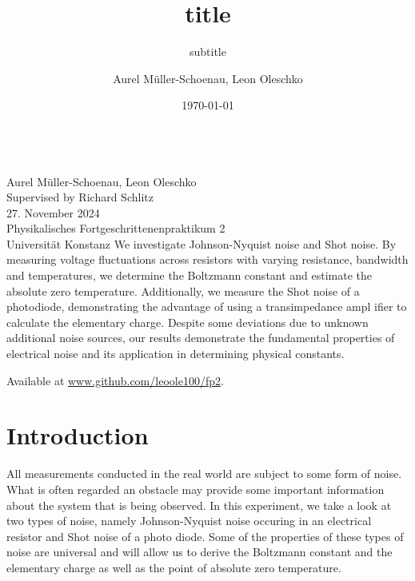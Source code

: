 \documentclass[
    parskip=half, 
    twoside=false,
    twocolumn=true,
    fontsize=11pt,
]{scrarticle}
\begin{document}
\title{title}
\subtitle{subtitle}
\author{Aurel Müller-Schoenau, Leon Oleschko}
\date{\dotdate\today}


\begin{titlepage}
    \sffamily
    \vspace*{3cm}
    {
        \fontsize{32}{32}
    }
    \vspace{.25cm}\\
    {
        \Large
        Aurel Müller-Schoenau, Leon Oleschko\\
        Supervised by Richard Schlitz
        \vspace{.05cm}\\
        27. November 2024
        \vspace{.25cm}\\
        \normalsize
        Physikalisches Fortgeschrittenenpraktikum 2\\
        Universität Konstanz
    }
    \vfill
    {
        \normalfont\normalsize
        We investigate Johnson-Nyquist noise and Shot noise.
        By measuring voltage fluctuations across resistors with varying resistance, bandwidth and temperatures, we determine the Boltzmann constant and estimate the absolute zero temperature. 
        Additionally, we measure the Shot noise of a photodiode, demonstrating the advantage of using a transimpedance ampl ifier to calculate the elementary charge.
        Despite some deviations due to unknown additional noise sources, our results demonstrate the fundamental properties of electrical noise and its application in determining physical constants.
    }
    \vfill
    \begin{flushright}
        Available at \url{www.github.com/leoole100/fp2}.
    \end{flushright}
\end{titlepage}

\section{Introduction}

All measurements conducted in the real world are subject to some form of noise. What is often regarded an obstacle may provide some important information about the system that is being observed. In this experiment, we take a look at two types of noise, namely Johnson-Nyquist noise occuring in an electrical resistor and Shot noise of a photo diode. Some of the properties of these types of noise are universal and will allow us to derive the Boltzmann constant and the elementary charge as well as the point of absolute zero temperature.
\end{document}
